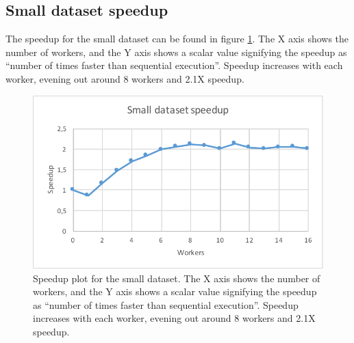 \subsection{Small dataset speedup}
The speedup for the small dataset can be found in figure \ref{fig:dataset_2_speedup}.
The X axis shows the number of workers, and the Y axis shows a scalar value signifying the speedup as
``number of times faster than sequential execution''. Speedup increases with each worker, evening out around 8 workers and 2.1X speedup.
\begin{figure}[ht]
  \centering
  \includegraphics[width=120mm]{figures/dataset_2/dataset_2_speedup.pdf}
  \caption[Speedup plot for the small dataset.]{Speedup plot for the small dataset. The X axis shows the number of workers, and the Y axis shows a scalar value signifying the speedup as
  ``number of times faster than sequential execution''. Speedup increases with each worker, evening out around 8 workers and 2.1X speedup.}
  \label{fig:dataset_2_speedup}
\end{figure}


